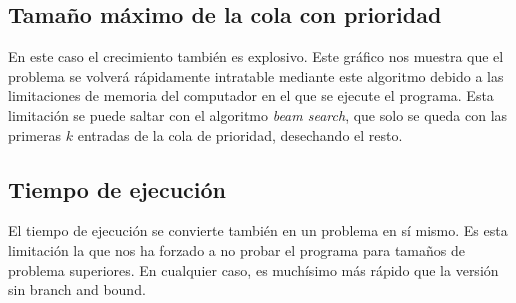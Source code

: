 \documentclass[a4paper, 11pt]{article}
\begin{document}
\subsection{Tamaño máximo de la cola con prioridad}
En este caso el crecimiento también es explosivo. Este gráfico nos muestra que el problema se volverá rápidamente intratable mediante este algoritmo debido a las limitaciones de memoria del computador en el que se ejecute el programa. Esta limitación se puede saltar con el algoritmo \textit{beam search}, que solo se queda con las primeras $k$ entradas de la cola de prioridad, desechando el resto.

\subsection{Tiempo de ejecución}
El tiempo de ejecución se convierte también en un problema en sí mismo. Es esta limitación la que nos ha forzado a no probar el programa para tamaños de problema superiores. En cualquier caso, es muchísimo más rápido que la versión sin branch and bound.
\end{document}
